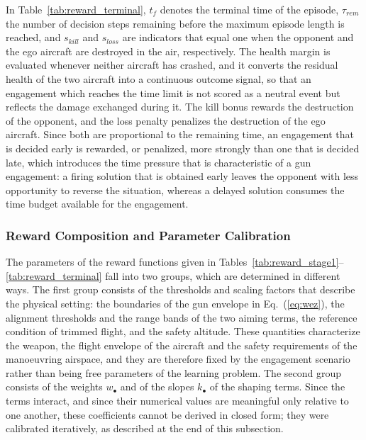 \documentclass[pdflatex,sn-mathphys-num]{sn-jnl}%
\theoremstyle{thmstyleone}%
\theoremstyle{thmstyletwo}%
\theoremstyle{thmstylethree}%
\begin{document}
In Table~\ref{tab:reward_terminal}, $t_{f}$ denotes the terminal time of the episode, $\tau_{rem}$ the number of decision steps remaining before the maximum episode length is reached, and $s_{kill}$ and $s_{loss}$ are indicators that equal one when the opponent and the ego aircraft are destroyed in the air, respectively. The health margin is evaluated whenever neither aircraft has crashed, and it converts the residual health of the two aircraft into a continuous outcome signal, so that an engagement which reaches the time limit is not scored as a neutral event but reflects the damage exchanged during it. The kill bonus rewards the destruction of the opponent, and the loss penalty penalizes the destruction of the ego aircraft. Since both are proportional to the remaining time, an engagement that is decided early is rewarded, or penalized, more strongly than one that is decided late, which introduces the time pressure that is characteristic of a gun engagement: a firing solution that is obtained early leaves the opponent with less opportunity to reverse the situation, whereas a delayed solution consumes the time budget available for the engagement.

\subsubsection{Reward Composition and Parameter Calibration}
\label{sec:reward_calibration}

The parameters of the reward functions given in Tables~\ref{tab:reward_stage1}--\ref{tab:reward_terminal} fall into two groups, which are determined in different ways. The first group consists of the thresholds and scaling factors that describe the physical setting: the boundaries of the gun envelope in Eq.~(\ref{eq:wez}), the alignment thresholds and the range bands of the two aiming terms, the reference condition of trimmed flight, and the safety altitude. These quantities characterize the weapon, the flight envelope of the aircraft and the safety requirements of the manoeuvring airspace, and they are therefore fixed by the engagement scenario rather than being free parameters of the learning problem. The second group consists of the weights $w_{\bullet}$ and of the slopes $k_{\bullet}$ of the shaping terms. Since the terms interact, and since their numerical values are meaningful only relative to one another, these coefficients cannot be derived in closed form; they were calibrated iteratively, as described at the end of this subsection.
\end{document}
